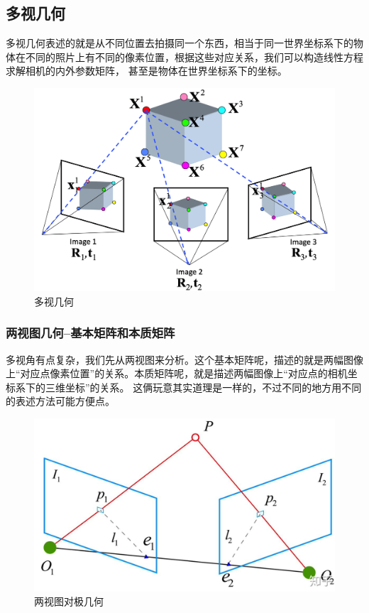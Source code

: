 \documentclass[12pt]{article}
\begin{document}
\newpage
\subsection{多视几何}
多视几何表述的就是从不同位置去拍摄同一个东西，相当于同一世界坐标系下的物体在不同的照片上有不同的像素位置，根据这些对应关系，我们可以构造线性方程求解相机的内外参数矩阵，
甚至是物体在世界坐标系下的坐标。
\begin{figure}[ht]
    \centering
    \includegraphics[scale=0.4]{./img/ds.png}
    \caption{多视几何}
    \label{fig:ds}
\end{figure}

\subsubsection{两视图几何--基本矩阵和本质矩阵}
多视角有点复杂，我们先从两视图来分析。这个基本矩阵呢，描述的就是两幅图像上“对应点像素位置”的关系。本质矩阵呢，就是描述两幅图像上“对应点的相机坐标系下的三维坐标”的关系。
这俩玩意其实道理是一样的，不过不同的地方用不同的表述方法可能方便点。

\begin{figure}[ht]
    \centering
    \includegraphics[scale=0.4]{./img/epipolar.png}
    \caption{两视图对极几何}
    \label{fig:ep}
\end{figure}
\end{document}
